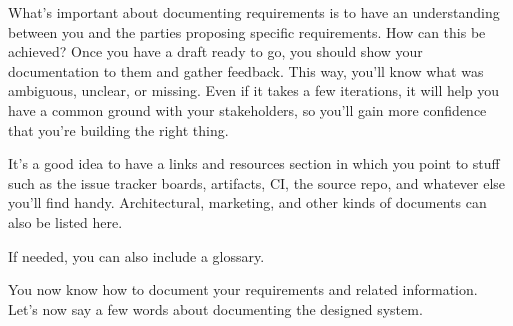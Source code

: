 What's important about documenting requirements is to have an understanding between you and the parties proposing specific requirements. How can this be achieved? Once you have a draft ready to go, you should show your documentation to them and gather feedback. This way, you'll know what was ambiguous, unclear, or missing. Even if it takes a few iterations, it will help you have a common ground with your stakeholders, so you'll gain more confidence that you're building the right thing.



It's a good idea to have a links and resources section in which you point to stuff such as the issue tracker boards, artifacts, CI, the source repo, and whatever else you'll find handy. Architectural, marketing, and other kinds of documents can also be listed here.

If needed, you can also include a glossary.

You now know how to document your requirements and related information. Let's now say a few words about documenting the designed system.


